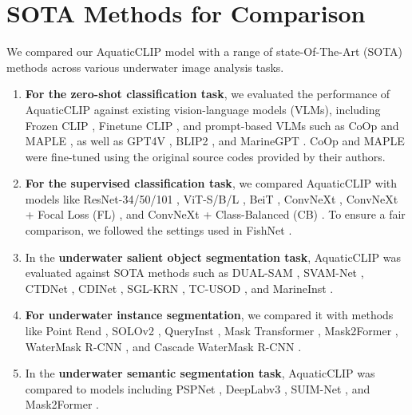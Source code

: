 \section{SOTA Methods for Comparison}
\label{sota}
We compared our AquaticCLIP model with a range of state-Of-The-Art (SOTA) methods across various underwater image analysis tasks.

\begin{enumerate}
    \item \textbf{For the zero-shot classification task}, we evaluated the performance of AquaticCLIP against existing vision-language models (VLMs), including Frozen CLIP \cite{radford2021learning}, Finetune CLIP \cite{radford2021learning}, and prompt-based VLMs such as CoOp \cite{zhou2022learning} and MAPLE \cite{khattak2023maple}, as well as GPT4V \cite{yang2023dawn}, BLIP2 \cite{li2023blip}, and MarineGPT \cite{zheng2023marinegpt}.
    CoOp and MAPLE were fine-tuned using the original source codes provided by their authors. 
    \item   \textbf{For the supervised classification task}, we compared AquaticCLIP with models like ResNet-34/50/101 \cite{he2016deep}, ViT-S/B/L \cite{alexey2020image}, BeiT \cite{bao2021beit}, ConvNeXt \cite{liu2022convnet}, ConvNeXt \cite{liu2022convnet} + Focal Loss (FL) \cite{lin2017focal}, and ConvNeXt \cite{liu2022convnet} + Class-Balanced (CB) \cite{cui2019class}.
  To ensure a fair comparison, we followed the settings used in FishNet \cite{khan2023fishnet}.
\item In the \textbf{underwater salient object segmentation task}, AquaticCLIP was evaluated against SOTA methods such as DUAL-SAM \cite{zhang2024fantastic}, SVAM-Net \cite{jahidul2020svam}, CTDNet \cite{zhao2021complementary}, CDINet \cite{zhang2021cross}, SGL-KRN \cite{xu2021locate}, TC-USOD \cite{usod10k}, and MarineInst \cite{ziqiang2024marineinst}.
\item \textbf{For underwater instance segmentation}, we compared it with methods like Point Rend \cite{pointrend_Kirillov_2020_CVPR}, SOLOv2 \cite{solov2_Wang2020}, QueryInst \cite{query_inst_Fang_2021_ICCV}, Mask Transformer \cite{mask_transfiner_Ke_2022_CVPR}, Mask2Former \cite{cheng2021mask2former}, WaterMask R-CNN \cite{sun2023indiscernible}, and Cascade WaterMask R-CNN \cite{sun2023indiscernible}. 
\item In the \textbf{underwater semantic segmentation task}, AquaticCLIP was compared to models including PSPNet \cite{p2pnet_Song_2021_ICCV}, DeepLabv3 \cite{deeplab}, SUIM-Net \cite{islam2020suim}, and  Mask2Former \cite{cheng2021mask2former}.

\end{enumerate}
